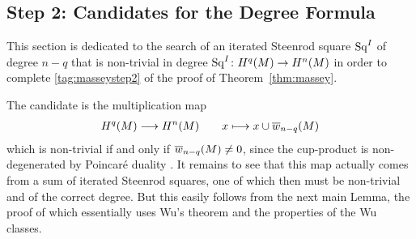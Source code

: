 \subsection[Candidates for the Degree Formula]
{Step 2: Candidates for the Degree Formula}

This section is dedicated to the search of an iterated Steenrod square
$\mathrm{Sq}^{I}$ of degree $n-q$ that is non-trivial in degree
$\mathrm{Sq}^{I}\colon H^q(M)\to H^n(M)$ in order to complete
\ref{tag:masseystep2} of the proof of Theorem~\ref{thm:massey}.

The candidate is the multiplication map
\begin{gather*}
  H^q(M) \longrightarrow H^n(M)
  \qquad
  x\longmapsto x\cup{\overline{w}_{n-q}}(M)
\end{gather*}
which is non-trivial if and only if ${\overline{w}_{n-q}}(M)\neq 0$, since the
cup-product is non-degenerated by Poincaré duality
\cite[Proposition~3.38]{hatcher}.
It remains to see that this map actually comes from a sum of
iterated Steenrod squares, one of which then must be non-trivial and
of the correct degree.
But this easily follows from the next main Lemma,
the proof of which essentially uses Wu's theorem and the properties of
the Wu classes.

